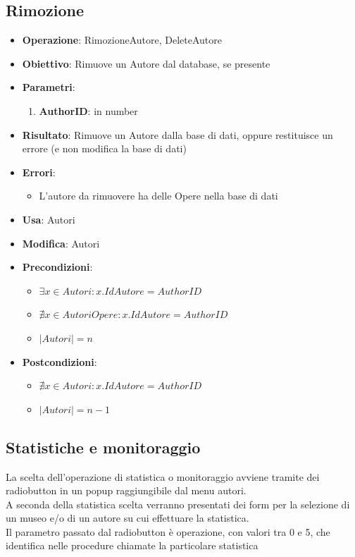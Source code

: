 \subsection{Rimozione}
\begin{itemize}
	\item \textbf{Operazione}: RimozioneAutore, DeleteAutore
	\item \textbf{Obiettivo}: Rimuove un Autore dal database, se presente
	\item \textbf{Parametri}:
	\begin{enumerate}
		\item \textbf{AuthorID}: in number
	\end{enumerate}
	\item \textbf{Risultato}: Rimuove un Autore dalla base di dati, oppure restituisce un errore (e non modifica la base di dati)
	\item \textbf{Errori}: 
	\begin{itemize}
		\item L'autore da rimuovere ha delle Opere nella base di dati
	\end{itemize}
	\item \textbf{Usa}: Autori
	\item \textbf{Modifica}: Autori
	\item \textbf{Precondizioni}:
	\begin{itemize}
		\item $\exists x \in Autori : x.IdAutore = AuthorID$
		\item $\nexists x \in AutoriOpere : x.IdAutore = AuthorID$
		\item $|Autori| = n$
	\end{itemize}
	\item \textbf{Postcondizioni}:
	\begin{itemize}
		\item $\nexists x \in Autori : x.IdAutore = AuthorID$
		\item $|Autori| = n - 1$
	\end{itemize}
\end{itemize}


\subsection{Statistiche e monitoraggio}
La scelta dell'operazione di statistica o monitoraggio avviene tramite dei radiobutton in un popup raggiungibile dal menu autori.\\
A seconda della statistica scelta verranno presentati dei form per la selezione di un museo e/o di un autore su cui effettuare la statistica.\\
Il parametro passato dal radiobutton è operazione, con valori tra 0 e 5, che identifica nelle procedure chiamate la particolare statistica

